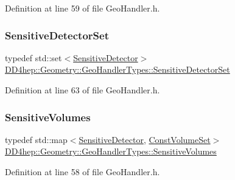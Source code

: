 Definition at line 59 of file Geo\+Handler.\+h.

\hypertarget{class_d_d4hep_1_1_geometry_1_1_geo_handler_types_a16da960fef01a5643d04a029e524374f}{}\label{class_d_d4hep_1_1_geometry_1_1_geo_handler_types_a16da960fef01a5643d04a029e524374f} 
\subsubsection{\texorpdfstring{Sensitive\+Detector\+Set}{SensitiveDetectorSet}}
{\footnotesize\ttfamily typedef std\+::set$<$\hyperlink{class_d_d4hep_1_1_geometry_1_1_sensitive_detector}{Sensitive\+Detector}$>$ \hyperlink{class_d_d4hep_1_1_geometry_1_1_geo_handler_types_a16da960fef01a5643d04a029e524374f}{D\+D4hep\+::\+Geometry\+::\+Geo\+Handler\+Types\+::\+Sensitive\+Detector\+Set}}



Definition at line 63 of file Geo\+Handler.\+h.

\hypertarget{class_d_d4hep_1_1_geometry_1_1_geo_handler_types_a530cdc551e68a5f975fe294329d27e63}{}\label{class_d_d4hep_1_1_geometry_1_1_geo_handler_types_a530cdc551e68a5f975fe294329d27e63} 
\subsubsection{\texorpdfstring{Sensitive\+Volumes}{SensitiveVolumes}}
{\footnotesize\ttfamily typedef std\+::map$<$\hyperlink{class_d_d4hep_1_1_geometry_1_1_sensitive_detector}{Sensitive\+Detector}, \hyperlink{class_d_d4hep_1_1_geometry_1_1_geo_handler_types_ae294545274767eb8cf886a303033b351}{Const\+Volume\+Set}$>$ \hyperlink{class_d_d4hep_1_1_geometry_1_1_geo_handler_types_a530cdc551e68a5f975fe294329d27e63}{D\+D4hep\+::\+Geometry\+::\+Geo\+Handler\+Types\+::\+Sensitive\+Volumes}}



Definition at line 58 of file Geo\+Handler.\+h.

